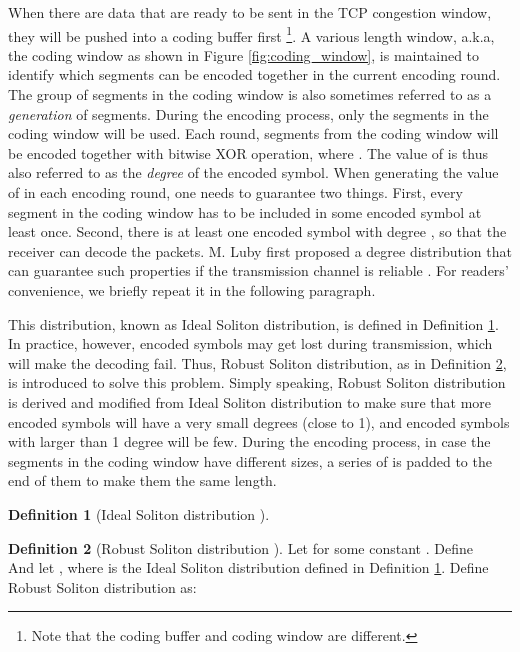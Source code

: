 \documentclass[10pt, conference, final, letterpaper]{IEEEtran}
\theoremstyle{definition}
\newtheorem{defn}{Definition}[section]
\begin{document}
When there are data that are ready to be sent in the TCP congestion window, they will be pushed into a coding buffer first \footnote{Note that the coding buffer and coding window are different.}. A various length window, a.k.a, the coding window as shown in Figure \ref{fig:coding_window}, is maintained to identify which segments can be encoded together in the current encoding round. The group of segments in the coding window is also sometimes referred to as a \textit{generation} of segments. During the encoding process, only the segments in the coding window will be used. Each round,  segments from the coding window will be encoded together with bitwise XOR operation, where . The value of  is thus also referred to as the \textit{degree} of the encoded symbol. When generating the value of  in each encoding round, one needs to guarantee two things. First, every segment in the coding window has to be included in some encoded symbol at least once. Second, there is at least one encoded symbol with degree , so that the receiver can decode the packets. M. Luby first proposed a degree distribution that can guarantee such properties if the transmission channel is reliable \cite{ltcodes}. For readers' convenience, we briefly repeat it in the following paragraph.

This distribution, known as Ideal Soliton distribution, is defined in Definition \ref{def:ideal_soliton}. In practice, however, encoded symbols may get lost during transmission, which will make the decoding fail. Thus, Robust Soliton distribution, as in Definition \ref{def:robust_soliton}, is introduced to solve this problem. Simply speaking, Robust Soliton distribution is derived and modified from Ideal Soliton distribution to make sure that more encoded symbols will have a very small degrees (close to 1), and encoded symbols with larger than 1 degree will be few. During the encoding process, in case the segments in the coding window have different sizes, a series of  is padded to the end of them to make them the same length.

\begin{defn}[Ideal Soliton distribution \cite{ltcodes}]\label{def:ideal_soliton}
	
\end{defn}

\begin{defn}[Robust Soliton distribution \cite{ltcodes}]\label{def:robust_soliton}
	Let  for some constant . Define \\
	
	And let , where  is the Ideal Soliton distribution defined in Definition \ref{def:ideal_soliton}. Define Robust Soliton distribution  as:
	
\end{defn}
\end{document}
